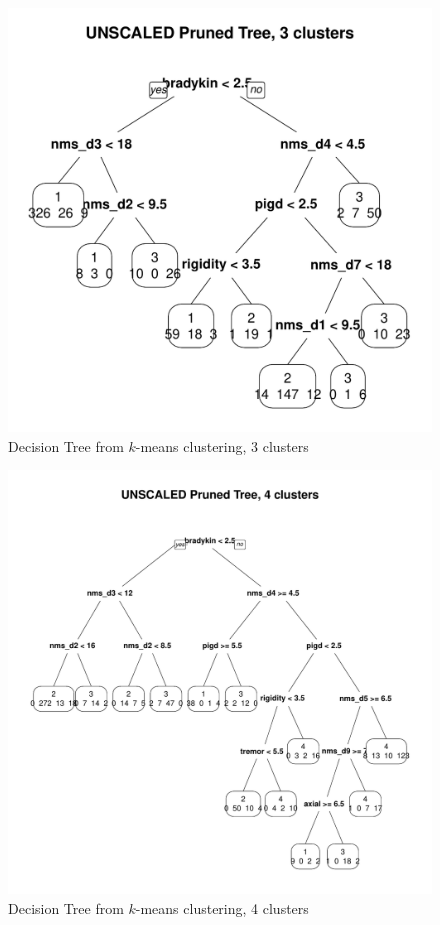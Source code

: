 \documentclass[letterpaper,12pt]{article}
\begin{document}
\begin{figure}[ht]
  \centering
  \includegraphics[width=0.8\linewidth]{dtree-kmeans-pruned-unscaled-3.pdf}
  \caption{Decision Tree from $k$-means clustering, 3 clusters}
  \label{fig:kmeans-dtree-3}
\end{figure}

\begin{figure}[ht]
  \centering
  \includegraphics[width=0.8\linewidth]{dtree-kmeans-pruned-unscaled-4.pdf}
  \caption{Decision Tree from $k$-means clustering, 4 clusters}
  \label{fig:kmeans-dtree-4}
\end{figure}
\end{document}
